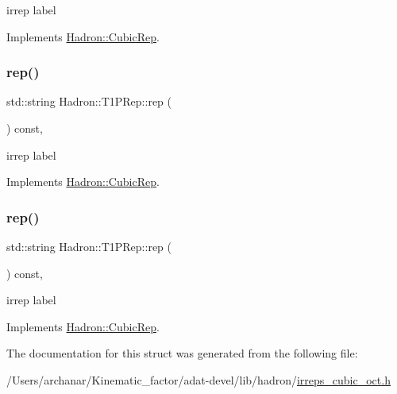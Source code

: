 irrep label 

Implements \mbox{\hyperlink{structHadron_1_1CubicRep_ac3eb63608803d44c68681f158e14eb1b}{Hadron\+::\+Cubic\+Rep}}.

\mbox{\label{structHadron_1_1T1PRep_abf59dcb0de05bb6acf26b43d0dd5e281}} 
\subsubsection{\texorpdfstring{rep()}{rep()}\hspace{0.1cm}{\footnotesize\ttfamily [2/3]}}
{\footnotesize\ttfamily std\+::string Hadron\+::\+T1\+P\+Rep\+::rep (\begin{DoxyParamCaption}{ }\end{DoxyParamCaption}) const\hspace{0.3cm}{\ttfamily [inline]}, {\ttfamily [virtual]}}

irrep label 

Implements \mbox{\hyperlink{structHadron_1_1CubicRep_ac3eb63608803d44c68681f158e14eb1b}{Hadron\+::\+Cubic\+Rep}}.

\mbox{\label{structHadron_1_1T1PRep_abf59dcb0de05bb6acf26b43d0dd5e281}} 
\subsubsection{\texorpdfstring{rep()}{rep()}\hspace{0.1cm}{\footnotesize\ttfamily [3/3]}}
{\footnotesize\ttfamily std\+::string Hadron\+::\+T1\+P\+Rep\+::rep (\begin{DoxyParamCaption}{ }\end{DoxyParamCaption}) const\hspace{0.3cm}{\ttfamily [inline]}, {\ttfamily [virtual]}}

irrep label 

Implements \mbox{\hyperlink{structHadron_1_1CubicRep_ac3eb63608803d44c68681f158e14eb1b}{Hadron\+::\+Cubic\+Rep}}.



The documentation for this struct was generated from the following file\+:\begin{DoxyCompactItemize}
\item 
/\+Users/archanar/\+Kinematic\+\_\+factor/adat-\/devel/lib/hadron/\mbox{\hyperlink{adat-devel_2lib_2hadron_2irreps__cubic__oct_8h}{irreps\+\_\+cubic\+\_\+oct.\+h}}\end{DoxyCompactItemize}
